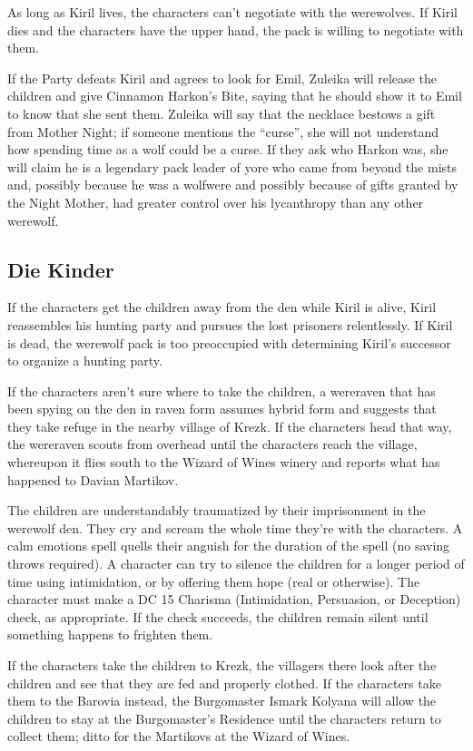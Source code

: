 \documentclass[a4paper,11pt]{article}
\begin{document}
As long as Kiril lives, the characters can't negotiate with the werewolves. If Kiril dies and the characters have 
the upper hand, the pack is willing to negotiate with them.

If the Party defeats Kiril and agrees to look for Emil, Zuleika will release the children and give Cinnamon 
Harkon's Bite, saying that he should show it to Emil to know that she sent them. Zuleika will say that the necklace 
bestows a gift from Mother Night; if someone mentions the ``curse'', she will not understand how spending time as a
wolf could be a curse. If they ask who Harkon was, she will claim he is a legendary pack leader of yore who came 
from beyond the mists and, possibly because he was a wolfwere and possibly because of gifts granted by the Night 
Mother, had greater control over his lycanthropy than any other werewolf.

\subsection{Die Kinder}
If the characters get the children away from the den while Kiril is alive, Kiril reassembles his hunting party and 
pursues the lost prisoners relentlessly. If Kiril is dead, the werewolf pack is too preoccupied with determining 
Kiril's successor to organize a hunting party.

If the characters aren't sure where to take the children, a wereraven that has been spying on the den in raven form 
assumes hybrid form and suggests that they take refuge in the nearby village of Krezk. If the characters head that 
way, the wereraven scouts from overhead until the characters reach the village, whereupon it flies south to the 
Wizard of Wines winery and reports what has happened to Davian Martikov.

The children are understandably traumatized by their imprisonment in the werewolf den. They cry and scream the 
whole time they're with the characters. A calm emotions spell quells their anguish for the duration of the spell 
(no saving throws required). A character can try to silence the children for a longer period of time using 
intimidation, or by offering them hope (real or otherwise). The character must make a DC 15 Charisma (Intimidation, 
Persuasion, or Deception) check, as appropriate. If the check succeeds, the children remain silent until something 
happens to frighten them.

If the characters take the children to Krezk, the villagers there look after the children and see that they are fed 
and properly clothed. If the characters take them to the Barovia instead, the Burgomaster Ismark Kolyana will allow 
the children to stay at the Burgomaster's Residence until the characters return to collect them; ditto for the 
Martikovs at the Wizard of Wines.
\end{document}
